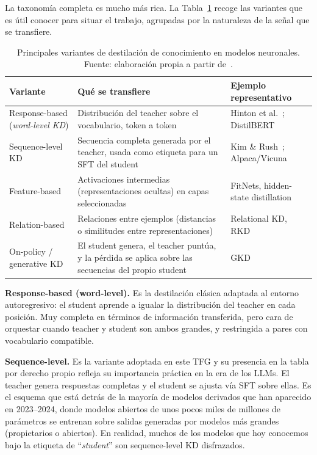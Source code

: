 \documentclass[11pt,a4paper]{article}
\begin{document}
La taxonomía completa es mucho más rica. La Tabla~\ref{tab:kd-variantes} recoge las variantes que es útil conocer para situar el trabajo, agrupadas por la naturaleza de la señal que se transfiere.

\begin{table}[H]
\centering
\caption{Principales variantes de destilación de conocimiento en modelos neuronales. Fuente: elaboración propia a partir de~\cite{hinton2015distilling, sanh2019distilbert, gou2021survey, agarwal2024gkd}.}
\label{tab:kd-variantes}
\footnotesize
\begin{tabularx}{\textwidth}{>{\raggedright\arraybackslash}p{3cm} >{\raggedright\arraybackslash}X >{\raggedright\arraybackslash}p{3.5cm}}
\toprule
\textbf{Variante} & \textbf{Qué se transfiere} & \textbf{Ejemplo representativo} \\
\midrule
Response-based (\textit{word-level KD}) & Distribución del teacher sobre el vocabulario, token a token & Hinton et al.~\cite{hinton2015distilling}; DistilBERT~\cite{sanh2019distilbert} \\
\addlinespace
Sequence-level KD & Secuencia completa generada por el teacher, usada como etiqueta para un SFT del student & Kim \& Rush~\cite{kim2016sequence}; Alpaca/Vicuna~\cite{taori2023alpaca} \\
\addlinespace
Feature-based & Activaciones intermedias (representaciones ocultas) en capas seleccionadas & FitNets, hidden-state distillation \\
\addlinespace
Relation-based & Relaciones entre ejemplos (distancias o similitudes entre representaciones) & Relational KD, RKD \\
\addlinespace
On-policy / generative KD & El student genera, el teacher puntúa, y la pérdida se aplica sobre las secuencias del propio student & GKD~\cite{agarwal2024gkd} \\
\bottomrule
\end{tabularx}
\end{table}

\textbf{Response-based (word-level).} Es la destilación clásica adaptada al entorno autoregresivo: el student aprende a igualar la distribución del teacher en cada posición. Muy completa en términos de información transferida, pero cara de orquestar cuando teacher y student son ambos grandes, y restringida a pares con vocabulario compatible.

\textbf{Sequence-level.} Es la variante adoptada en este TFG y su presencia en la tabla por derecho propio refleja su importancia práctica en la era de los LLMs. El teacher genera respuestas completas y el student se ajusta vía SFT sobre ellas. Es el esquema que está detrás de la mayoría de modelos derivados que han aparecido en 2023--2024, donde modelos abiertos de unos pocos miles de millones de parámetros se entrenan sobre salidas generadas por modelos más grandes (propietarios o abiertos). En realidad, muchos de los modelos que hoy conocemos bajo la etiqueta de ``\textit{student}'' son sequence-level KD disfrazados.
\end{document}
